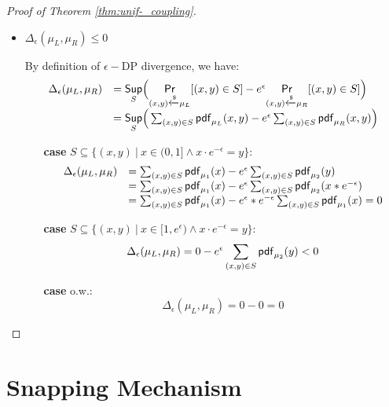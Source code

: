 \documentclass[a4paper,11pt]{article}
\begin{document}
\begin{proof}[Proof of Theorem \ref{thm:unif-_coupling}]
\begin{itemize}
	\item $\Delta_{\epsilon}(\mu_L, \mu_R) \leq 0$

	By definition of $\epsilon-$DP divergence, we have:
	 \[
	 \begin{array}{ll}
	 \Delta_{\epsilon}(\mu_L, \mu_R) 
	 & = \underset{S}{\mathsf{Sup}}
	 \Big(
	 \underset{(x,y) \xleftarrow{\$} \mu_L}{\mathsf{Pr}}[(x,y) \in S] - e^{\epsilon} \underset{(x,y) \xleftarrow{\$} \mu_R}{\mathsf{Pr}}[(x,y) \in S]
	 \Big) \\
	 & =\underset{S}{\mathsf{Sup}}
	 \Big(
	 \sum_{(x,y) \in S} \mathsf{pdf}_{\mu_L}(x, y) - e^{\epsilon} \sum_{(x,y) \in S} \mathsf{pdf}_{\mu_R}(x, y)
	 \Big)	 
	 \end{array}
	 \]
	 \begin{itemize}
	 	\item[{\bf case}]
	 	$S \subseteq \{(x, y) ~|~ 
	 	x \in (0, 1] \land x \cdot e^{-\epsilon} = y \}$:
		\[
		 \begin{array}{ll}
		 \Delta_{\epsilon}(\mu_L, \mu_R) 
		 & = 
		 \sum_{(x,y) \in S} \mathsf{pdf}_{\mu_1}(x) - e^{\epsilon} \sum_{(x,y) \in S} \mathsf{pdf}_{\mu_2}(y)\\
		 & = 
		 \sum_{(x,y) \in S} \mathsf{pdf}_{\mu_1}(x) - e^{\epsilon} \sum_{(x,y) \in S} \mathsf{pdf}_{\mu_2}(x * e^{-\epsilon})\\ 
		 & = 
		 \sum_{(x,y) \in S} \mathsf{pdf}_{\mu_1}(x) - e^{\epsilon}* e^{-\epsilon} \sum_{(x,y) \in S} \mathsf{pdf}_{\mu_1}(x) 
		 = 0 
		 \end{array}
		 \]
	 	\item[{\bf case}] $S \subseteq \{(x, y) 
	 	~|~ x \in [1, e^{\epsilon}) 
	 	\land x \cdot e^{-\epsilon} = y \}$:
		 \[
		 \Delta_{\epsilon}(\mu_L, \mu_R) 
		 = 
		 0 - e^{\epsilon} \sum_{(x,y) \in S} \mathsf{pdf}_{\mu_2}(y) <0
		 \]
	 	\item[{\bf case}] o.w.:
		 \[
		 \Delta_{\epsilon}(\mu_L, \mu_R) = 0 - 0 =  0 
		 \]	 	

	 \end{itemize}

\end{itemize}
\end{proof}
%
\newpage
\section{Snapping Mechanism}
\end{document}
